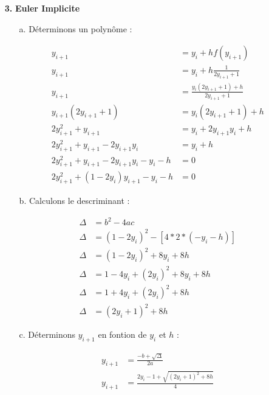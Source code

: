 \documentclass[12pt, letterpaper]{article}
\begin{document}
\begin{enumerate}
\begin{enumerate}
\end{enumerate}

\item[\textbf{3.}] \textbf{Euler Implicite}

\begin{enumerate}
\item[a.] Déterminons un polynôme :

  \begin{equation*}
    \begin{split}
      y_{i+1} & = y_i + h f(y_{i+1}) \\
      y_{i+1} & = y_i + h \frac{1}{2y_{i+1} + 1} \\
      y_{i+1} & = \frac{y_i (2y_{i+1} + 1) + h}{2y_{i+1} + 1} \\
      y_{i+1} (2y_{i+1} + 1) & = y_i (2y_{i+1} + 1) + h \\
      2y_{i+1}^2 + y_{i+1} & = y_i + 2y_{i+1}y_i + h \\
      2y_{i+1}^2 + y_{i+1} - 2y_{i+1}y_i & = y_i + h \\
      2y_{i+1}^2 + y_{i+1} - 2y_{i+1}y_i - y_i - h & = 0 \\
      2y_{i+1}^2 + (1 - 2y_i) y_{i+1} - y_i - h & = 0
    \end{split}
  \end{equation*}

\item[b.] Calculons le descriminant :

    \begin{equation*}
    \begin{split}
      \Delta & = b^2 - 4ac \\
      \Delta & = (1 - 2y_i)^2 - [4 * 2 * (- y_i - h)] \\
      \Delta & = (1 - 2y_i)^2 + 8y_i + 8h \\
      \Delta & = 1 - 4y_i + (2y_i)^2 + 8y_i + 8h \\
      \Delta & = 1 + 4y_i + (2y_i)^2 + 8h \\
      \Delta & = (2y_i + 1)^2 + 8h
    \end{split}
  \end{equation*}

\item[c.] Déterminons $y_{i+1}$ en fontion de $y_i$ et $h$ :

  \begin{equation*}
    \begin{split}
      y_{i+1} & = \frac{- b + \sqrt{\Delta}}{2a} \\
      y_{i+1} & = \frac{2y_i - 1 + \sqrt{(2y_i + 1)^2 + 8h}}{4} 
    \end{split}
  \end{equation*}


\end{enumerate}
\end{enumerate}
\end{document}
